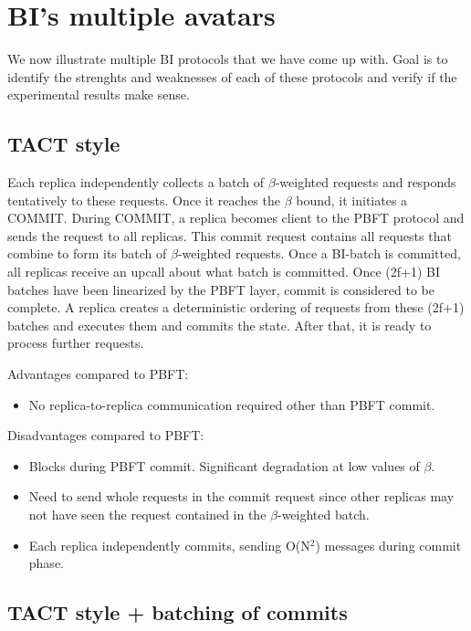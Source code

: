 \section{BI's multiple avatars}

We now illustrate multiple BI protocols that we have come up with. Goal
is to identify the strenghts and weaknesses of each of these protocols and
verify if the experimental results make sense.

\subsection{TACT style}
Each replica independently collects a batch of $\beta$-weighted requests and
responds tentatively to these requests. Once it reaches the $\beta$ bound, it
initiates a COMMIT. During COMMIT, a replica becomes client to the PBFT 
protocol and sends the request to all replicas. This commit request contains
all requests that combine to form its batch of $\beta$-weighted requests.
Once a BI-batch is committed, all replicas receive an upcall about what batch
is committed. Once (2f+1) BI batches have been linearized by the PBFT layer,
commit is considered to be complete. A replica creates a deterministic
ordering of requests from these (2f+1) batches and executes them and commits
the state. After that, it is ready to process further requests.

Advantages compared to PBFT:
\begin{itemize}
\item{} No replica-to-replica communication required other than PBFT commit.
\end{itemize}

Disadvantages compared to PBFT:
\begin{itemize}
\item{} Blocks during PBFT commit. Significant degradation at low values of 
$\beta$.
\item{} Need to send whole requests in the commit request since other replicas
may not have seen the request contained in the $\beta$-weighted batch.
\item{} Each replica independently commits, sending O(N$^2$) messages during
commit phase.
\end{itemize}



\subsection{TACT style + batching of commits}

